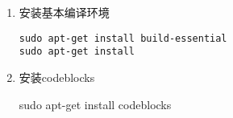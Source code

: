 \documentclass[12pt]{article}
\begin{document}
\begin{enumerate}

\item 安装基本编译环境

\begin{lstlisting}
sudo apt-get install build-essential 
sudo apt-get install
\end{lstlisting}


\item 安装codeblocks

sudo apt-get install codeblocks


\begin{comment}

wxWidgets 工具包提供图形用户界面（GUI）开发所需的一些功能强大的跨平台工具。除了原生的 C++, 还有其他几种语言提供了使用该工具包所需的包装程序。我们一般用不到，可以先不装

sudo apt-get install wxformbuilder

\item 安装wxWidgets

sudo apt-get install libwxbase2.8

sudo apt-get install libwxbase2.8-dev

sudo apt-get install libwxgtk2.8-0

sudo apt-get install libwxgtk2.8-dev

sudo apt-get install libwxgtk2.8-dbg

sudo apt-get install wx-common

sudo apt-get install wx2.8-headers

sudo apt-get install wx2.8-i18n

wx2.8-examples和wx2.8-doc想看文档可以装上

\item 配置codeblocks

打开codeblocks

settings->global variables

current variable标签后面点击new按钮，出来的框框填写wx

然后 built-in fields下面

base /usr

include /usr/include/wx-2.8

lib /usr/lib

点击close保存
 
\end{comment}

\end{enumerate}
\end{document}
